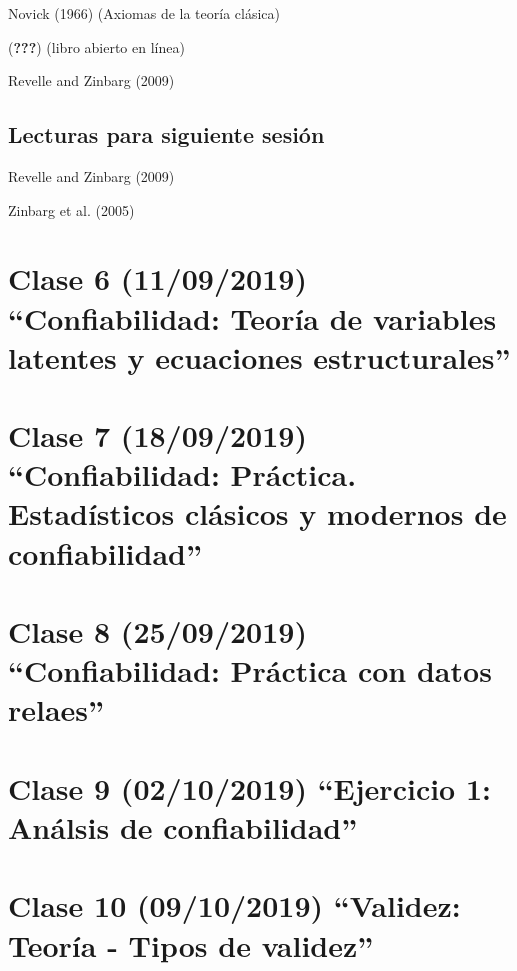 \documentclass[11pt,]{article}
\begin{document}
Novick (1966) (Axiomas de la teoría clásica)

({\textbf{???}}) (libro abierto en línea)

Revelle and Zinbarg (2009)

\hypertarget{lecturas-para-siguiente-sesion-3}{%
\subsection{Lecturas para siguiente
sesión}\label{lecturas-para-siguiente-sesion-3}}

Revelle and Zinbarg (2009)

Zinbarg et al. (2005)

\hypertarget{clase-6-11092019-confiabilidad-teoria-de-variables-latentes-y-ecuaciones-estructurales}{%
\section{Clase 6 (11/09/2019) ``Confiabilidad: Teoría de variables
latentes y ecuaciones
estructurales''}\label{clase-6-11092019-confiabilidad-teoria-de-variables-latentes-y-ecuaciones-estructurales}}

\hypertarget{clase-7-18092019-confiabilidad-practica.-estadisticos-clasicos-y-modernos-de-confiabilidad}{%
\section{Clase 7 (18/09/2019) ``Confiabilidad: Práctica. Estadísticos
clásicos y modernos de
confiabilidad''}\label{clase-7-18092019-confiabilidad-practica.-estadisticos-clasicos-y-modernos-de-confiabilidad}}

\hypertarget{clase-8-25092019-confiabilidad-practica-con-datos-relaes}{%
\section{Clase 8 (25/09/2019) ``Confiabilidad: Práctica con datos
relaes''}\label{clase-8-25092019-confiabilidad-practica-con-datos-relaes}}

\hypertarget{clase-9-02102019-ejercicio-1-analsis-de-confiabilidad}{%
\section{Clase 9 (02/10/2019) ``Ejercicio 1: Análsis de
confiabilidad''}\label{clase-9-02102019-ejercicio-1-analsis-de-confiabilidad}}

\hypertarget{clase-10-09102019-validez-teoria---tipos-de-validez}{%
\section{Clase 10 (09/10/2019) ``Validez: Teoría - Tipos de
validez''}\label{clase-10-09102019-validez-teoria---tipos-de-validez}}
\end{document}
